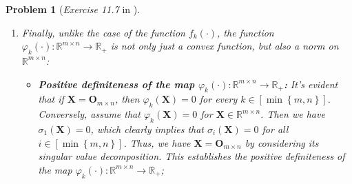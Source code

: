 \documentclass[11pt]{article}
\newtheorem{problem}{Problem}
\numberwithin{equation}{problem}
\begin{document}
\begin{problem} [\emph{Exercise 11.7} in \cite{calafiore2014optimization}]
{\begin{enumerate} [label=(\roman*)]
\begin{equation}
\begin{split}
            &= \left\{ \left( \mathbf{X}, t \right) \in \mathbb{R}^{m \times n} \times \mathbb{R}: f_k \left( \Phi (\mathbf{X}) \right) \leq t \right\} \\
            &= \left\{ \left( \mathbf{X}, t \right) \in \mathbb{R}^{m \times n} \times \mathbb{R}: \left( \Phi (\mathbf{X}), t \right) \in \textsf{epi} \left( f_k \right) \right\}. \\
        \end{split}
    \end{equation}
    We know from the part (2) that the epigraph $\textsf{epi} \left( f_k \right)$ of the function $f_k (\cdot) : \mathcal{S}^{m+n} \rightarrow \mathbb{R}$ is a convex subset of $\mathcal{S}^{m+n} \times \mathbb{R}$ due to the convexity of $f_k (\cdot) : \mathcal{S}^{m+n} \rightarrow \mathbb{R}$. As $\Phi (\cdot) : \mathbb{R}^{m \times n} \rightarrow \mathcal{S}^{m+n}$ is an $\mathbb{R}$-linear map, it's clear that the map
    \begin{equation}
        \label{eqn2.12}
        \left( \mathbf{X}, t \right) \in \mathbb{R}^{m \times n} \times \mathbb{R} \mapsto \left( \Phi (\mathbf{X}), t \right) \in \mathcal{S}^{m+n} \times \mathbb{R}
    \end{equation}
    is also an $\mathbb{R}$-linear map. So from \eqref{eqn2.11}, it follows that $\textsf{epi} \left( \varphi_k \right)$ is a convex subset of $\mathbb{R}^{m \times n} \times \mathbb{R}$ since it is an inverse image of the convex subset $\textsf{epi} \left( f_k \right)$ of $\mathcal{S}^{m+n} \times \mathbb{R}$ under the $\mathbb{R}$-linear map \eqref{eqn2.12}. Hence, the function $\varphi_k (\cdot): \mathbb{R}^{m \times n} \rightarrow \mathbb{R}_{+}$ is a convex function;
    \item Finally, unlike the case of the function $f_k (\cdot)$, the function $\varphi_k (\cdot): \mathbb{R}^{m \times n} \rightarrow \mathbb{R}_{+}$ is not only just a convex function, but also a norm on $\mathbb{R}^{m \times n}$:
    \begin{itemize}
        \item \textbf{Positive definiteness of the map $\varphi_k (\cdot): \mathbb{R}^{m \times n} \rightarrow \mathbb{R}_{+}$:} It's evident that if $\mathbf{X} = \mathbf{O}_{m \times n}$, then $\varphi_k (\mathbf{X}) = 0$ for every $k \in \left[ \min \left\{ m, n \right\} \right]$. Conversely, assume that $\varphi_k (\mathbf{X}) = 0$ for $\mathbf{X} \in \mathbb{R}^{m \times n}$. Then we have $\sigma_{1} (\mathbf{X}) = 0$, which clearly implies that $\sigma_i (\mathbf{X}) = 0$ for all $i \in \left[ \min \left\{ m, n \right\} \right]$. Thus, we have $\mathbf{X} = \mathbf{O}_{m \times n}$ by considering its singular value decomposition. This establishes the positive definiteness of the map $\varphi_k (\cdot): \mathbb{R}^{m \times n} \rightarrow \mathbb{R}_{+}$;

\end{itemize}
\end{enumerate}}
\end{problem}
\end{document}
